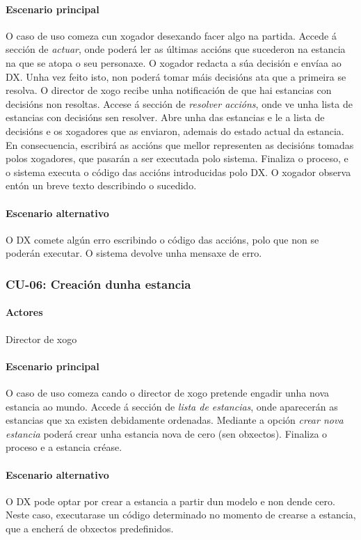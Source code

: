 \paragraph{Escenario principal}
O caso de uso comeza cun xogador desexando facer algo na partida. Accede á
sección de {\it actuar}, onde poderá ler as últimas accións que sucederon na
estancia na que se atopa o seu personaxe. O xogador redacta a súa decisión e
envíaa ao DX. Unha vez feito isto, non poderá tomar máis decisións ata que a
primeira se resolva.
O director de xogo recibe unha notificación de que hai estancias con decisións
non resoltas. Accese á sección de {\it resolver accións}, onde ve unha lista de
estancias con decisións sen resolver. Abre unha das estancias e le a lista de
decisións e os xogadores que as enviaron, ademais do estado actual da estancia.
En consecuencia, escribirá as accións que mellor representen as decisións
tomadas polos xogadores, que pasarán a ser executada polo sistema. Finaliza o
proceso, e o sistema executa o código das accións introducidas polo DX. O
xogador observa entón un breve texto describindo o sucedido.

\paragraph{Escenario alternativo}
O DX comete algún erro escribindo o código das accións, polo que non se poderán
executar. O sistema devolve unha mensaxe de erro.

\subsubsection{CU-06: Creación dunha estancia}
\paragraph{Actores}
Director de xogo
\paragraph{Escenario principal}
O caso de uso comeza cando o director de xogo pretende engadir unha nova
estancia ao mundo. Accede á sección de {\it lista de estancias}, onde aparecerán
as estancias que xa existen debidamente ordenadas. Mediante a opción {\it crear
nova estancia} poderá crear unha estancia nova de cero (sen obxectos). Finaliza
o proceso e a estancia créase.

\paragraph{Escenario alternativo}
O DX pode optar por crear a estancia a partir dun modelo e non dende cero. Neste
caso, executarase un código determinado no momento de crearse a estancia, que a
encherá de obxectos predefinidos.

